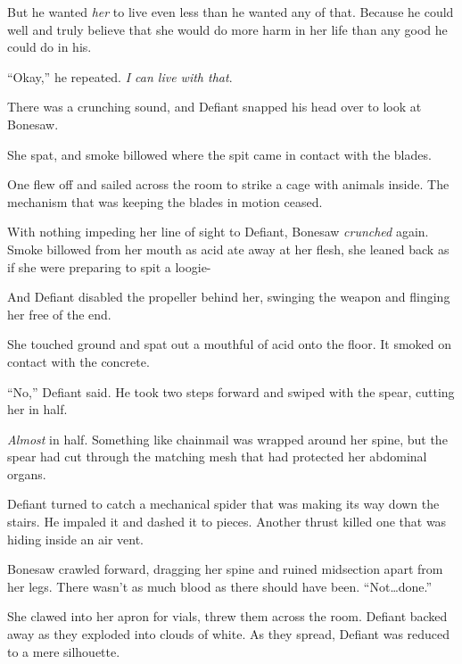 But he wanted \emph{her} to live even less than he wanted any of that.  Because he could well and truly believe that she would do more harm in her life than any good he could do in his.



``Okay,'' he repeated.  \emph{I can live with that}.



There was a crunching sound, and Defiant snapped his head over to look at Bonesaw.



She spat, and smoke billowed where the spit came in contact with the blades.



One flew off and sailed across the room to strike a cage with animals inside.  The mechanism that was keeping the blades in motion ceased.



With nothing impeding her line of sight to Defiant, Bonesaw \emph{crunched} again.  Smoke billowed from her mouth as acid ate away at her flesh, she leaned back as if she were preparing to spit a loogie-



And Defiant disabled the propeller behind her, swinging the weapon and flinging her free of the end.



She touched ground and spat out a mouthful of acid onto the floor.  It smoked on contact with the concrete.



``No,'' Defiant said.  He took two steps forward and swiped with the spear, cutting her in half.



\emph{Almost} in half.  Something like chainmail was wrapped around her spine, but the spear had cut through the matching mesh that had protected her abdominal organs.



Defiant turned to catch a mechanical spider that was making its way down the stairs.  He impaled it and dashed it to pieces.  Another thrust killed one that was hiding inside an air vent.



Bonesaw crawled forward, dragging her spine and ruined midsection apart from her legs.  There wasn't as much blood as there should have been.  ``Not\ldots done.''



She clawed into her apron for vials, threw them across the room.  Defiant backed away as they exploded into clouds of white.  As they spread, Defiant was reduced to a mere silhouette.



